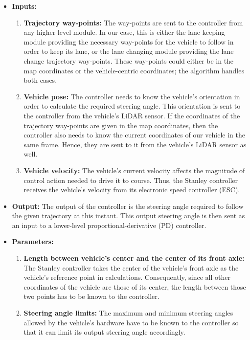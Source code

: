     \begin{itemize}
    \item \textbf{Inputs:}
        \begin{enumerate}
        \item \textbf{Trajectory way-points:} 
        The way-points are sent to the controller from any higher-level module. In our case, this is either the lane keeping module providing the necessary way-points for the vehicle to follow in order to keep its lane, or the lane changing module providing the lane change trajectory way-points. These way-points could either be in the map coordinates or the vehicle-centric coordinates; the algorithm handles both cases.
        
        \item \textbf{Vehicle pose:}
        The controller needs to know the vehicle’s orientation in order to calculate the required steering angle. This orientation is sent to the controller from the vehicle’s LiDAR sensor. If the coordinates of the trajectory way-points are given in the map coordinates, then the controller also needs to know the current coordinates of our vehicle in the same frame. Hence, they are sent to it from the vehicle’s LiDAR sensor as well.
        
        \item \textbf{Vehicle velocity:}
        The vehicle’s current velocity affects the magnitude of control action needed to drive it to course. Thus, the Stanley controller receives the vehicle’s velocity from its electronic speed controller (ESC).
        \end{enumerate}
    
    \item \textbf{Output:} 
    The output of the controller is the steering angle required to follow the given trajectory at this instant. This output steering angle is then sent as an input to a lower-level proportional-derivative (PD) controller.
    
    \item \textbf{Parameters:}
        \begin{enumerate}
        \item \textbf{Length between vehicle’s center and the center of its front axle:} 
        The Stanley controller takes the center of the vehicle’s front axle as the vehicle’s reference point in calculations. Consequently, since all other coordinates of the vehicle are those of its center, the length between those two points has to be known to the controller.
        
        \item \textbf{Steering angle limits:}
        The maximum and minimum steering angles allowed by the vehicle’s hardware have to be known to the controller so that it can limit its output steering angle accordingly.
        \end{enumerate}
    \end{itemize}
    
